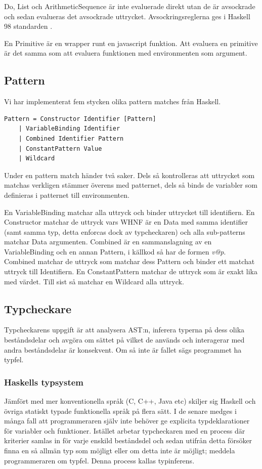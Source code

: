 Do, List och ArithmeticSequence är inte evaluerade direkt utan de är avsockrade och sedan evalueras det avsockrade uttrycket. Avsockringsreglerna ges i Haskell 98 standarden \citep{haskell98chap3}.

En Primitive är en wrapper runt en javascript funktion. Att evaluera en primitive är det samma som att evaluera funktionen med environmenten som argument.

\subsection{Pattern}
Vi har implementerat fem stycken olika pattern matches från Haskell.
\begin{lstlisting}
Pattern = Constructor Identifier [Pattern]
    | VariableBinding Identifier
    | Combined Identifier Pattern
    | ConstantPattern Value
    | Wildcard
\end{lstlisting}
Under en pattern match händer två saker. Dels så kontrolleras att uttrycket som matchas verkligen stämmer överens med patternet, dels så binds de variabler som definieras i patternet till environmenten. 

En VariableBinding matchar alla uttryck och binder uttrycket till identifiern. En Constructor matchar de uttryck vars WHNF är en Data med samma identifier (samt samma typ, detta enforcas dock av typcheckaren) och alla sub-patterns matchar Data argumenten. Combined är en sammanslagning av en VariableBinding och en annan Pattern, i källkod så har de formen \emph{v@p}. Combined matchar de uttryck som matchar dess Pattern och binder ett matchat uttryck till Identifiern. En ConstantPattern matchar de uttryck som är exakt lika med värdet. Till sist så matchar en Wildcard alla uttryck.


\subsection{Typcheckare} 
Typcheckarens uppgift är att analysera AST:n, inferera typerna på dess olika
beståndsdelar och avgöra om sättet på vilket de används och interagerar med
andra beståndsdelar är konsekvent. Om så inte är fallet sägs programmet ha
typfel.

\subsubsection{Haskells typsystem}
Jämfört med mer konventionella språk (C, C++, Java etc) skiljer sig Haskell
och övriga statiskt typade funktionella språk på flera sätt. I de senare
medges i många fall att programmeraren själv inte behöver ge explicita
typdeklarationer för variabler och funktioner. Istället arbetar typcheckaren
med en process där kriterier samlas in för varje enskild beståndsdel och
sedan utifrån detta försöker finna en så allmän typ som möjligt eller om
detta inte är möjligt; meddela programmeraren om typfel. Denna process
kallas typinferens.

